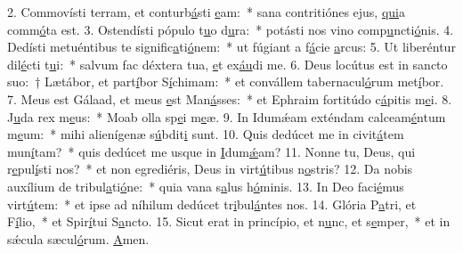 2. Commovísti terram, et conturb\uline{á}sti \uline{e}am:~* sana contritiónes ejus, \uline{qui}a comm\uline{ó}ta est.
3. Ostendísti pópulo t\uline{u}o d\uline{u}ra:~* potásti nos vino comp\uline{u}ncti\uline{ó}nis.
4. Dedísti metuéntibus te signific\uline{a}ti\uline{ó}nem:~* ut fúgiant a f\uline{á}cie \uline{a}rcus:
5. Ut liberéntur dil\uline{é}cti t\uline{u}i:~* salvum fac déxtera tua, \uline{e}t ex\uline{áu}di me.
6. Deus locútus est in sancto suo:~† Lætábor, et part\uline{í}bor S\uline{í}chimam:~* et convállem tabernacul\uline{ó}rum met\uline{í}bor.
7. Meus est Gálaad, et meus \uline{e}st Man\uline{á}sses:~* et Ephraim fortitúdo c\uline{á}pitis m\uline{e}i.
8. J\uline{u}da rex m\uline{e}us:~* Moab olla sp\uline{e}i m\uline{e}æ.
9. In Idumǽam exténdam calceam\uline{é}ntum m\uline{e}um:~* mihi alienígenæ s\uline{ú}bdit\uline{i} sunt.
10. Quis dedúcet me in civit\uline{á}tem mun\uline{í}tam?~* quis dedúcet me usque in \uline{I}dum\uline{ǽ}am?
11. Nonne tu, Deus, qui r\uline{e}pul\uline{í}sti nos?~* et non egrediéris, Deus in virt\uline{ú}tibus n\uline{o}stris?
12. Da nobis auxílium de tribul\uline{a}ti\uline{ó}ne:~* quia vana s\uline{a}lus h\uline{ó}minis.
13. In Deo faci\uline{é}mus virt\uline{ú}tem:~* et ipse ad níhilum dedúcet tr\uline{i}bul\uline{á}ntes nos.
14. Glória P\uline{a}tri, et F\uline{í}lio,~* et Spir\uline{í}tui S\uline{a}ncto.
15. Sicut erat in princípio, et n\uline{u}nc, et s\uline{e}mper,~* et in sǽcula sæcul\uline{ó}rum. \uline{A}men.
